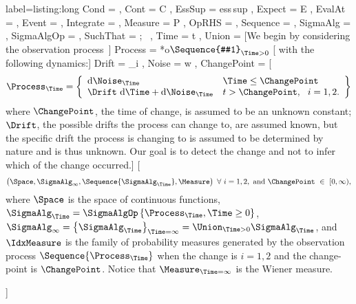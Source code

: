 \documentclass{article}
\begin{document}
\begin{listing}[Long]
  {label=listing:long}
  \Ccool
  {
    Cond = { \mid },
    Cont = { C },
    EssSup = { \textrm{ess\,sup} },
    Expect = { E },
    EvalAt = ,
    Event = \CcoolLambda{\left\{#1\right\}},
    Integrate = ,
    Measure = { P },
    OpRHS = \CcoolLambda{\left[#1\right]},
    Sequence = \CcoolLambda{\left\{#1\right\}},
    SigmaAlg = {  },
    SigmaAlgOp = { \operatorname{\sigma} },
    SuchThat = { ;~ },
    Time = { t },
    Union = { \cup }                                                      
  }
  [We begin by considering the observation process~]
  { Process = { \xi } }*o{$\Sequence{#1}_{\Time>0}$} 
  [ with the following dynamics:]
  { Drift = { \mu_i }, Noise = { w }, ChangePoint = { \tau } }   
  [\begin{displaymath}
    \Process_{\Time} = \left\{
      \begin{array}{ll}
        \dif\Noise_{\Time}  & \Time \le \ChangePoint \\
        \Drift\, \dif\Time + \dif\Noise_{\Time} &  t > \ChangePoint,~~i=1,2.
      \end{array}\right\}
  \end{displaymath}where $\ChangePoint$, the time of change, is assumed to be an unknown constant; $\Drift$, the possible drifts the process can change to, are assumed known, but the specific drift the process is changing to is assumed to be determined by nature and is thus unknown. Our goal is to detect the change and not to infer which of the change occurred.]{}
  \Ccool[The probability triple is~]
  { Space = { \Cont{[}0,\infty{)} }, IdxMeasure = { \Measure^i_{\ChangePoint} } } 
  [\begin{equation*}
    \left(\Space, \SigmaAlg_{\infty}, \Sequence{\SigmaAlg_{\Time}}, \Measure\right)~\forall~i=1,2,~\rm{and}~\ChangePoint~\in~{[}0,\infty{)},
  \end{equation*}where $\Space$ is the space of continuous functions,
  $\SigmaAlg_{\Time} = \SigmaAlgOp\left\{\Process_{\Time}, \Time \ge 0\right\}$, $\SigmaAlg_{\infty} = \left\{\SigmaAlg_{\Time}\right\}_{\Time=\infty} = \Union_{\Time>0} \SigmaAlg_{\Time}$, and $\IdxMeasure$ is the family of probability measures generated by the observation process $\Sequence{\Process_{\Time}}$ when the change is $i=1,2$ and the change-point is $\ChangePoint$. Notice that $\Measure_{\Time=\infty}$ is the Wiener measure.\par]{}


\end{listing}
\end{document}
